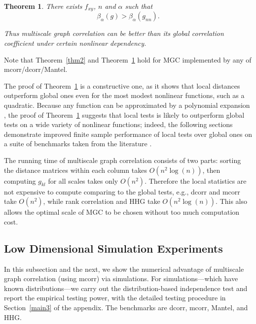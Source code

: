 \documentclass[11pt]{article}
\newcommand{\cs}[1]{{\color{blue}{#1}}}
\newtheorem{thm}{Theorem}
\begin{document}
\begin{thm}
\label{thm3}
There exists $f_{xy}$, $n$ and $\alpha$ such that 
\begin{equation}
\beta_{\alpha}(g) > \beta_{\alpha}(g_{nn}).
\end{equation}

Thus multiscale graph correlation can be better than its global correlation coefficient under certain nonlinear dependency.
\end{thm}
Note that Theorem~\ref{thm2} and Theorem~\ref{thm3} hold for MGC implemented by any of mcorr/dcorr/Mantel.

The proof of Theorem~\ref{thm3} is a constructive one, as it shows that local distances outperform global ones even for the most modest nonlinear functions, such as a quadratic.  Because any function can be approximated by a polynomial expansion \cite{RudinBook}, the proof of Theorem~\ref{thm3} suggests that local tests is likely to outperform global tests on a wide variety of nonlinear functions; indeed, the following sections demonstrate improved finite sample performance of local tests over global ones on a suite of benchmarks taken from the literature \cite{SzekelyRizzoBakirov2007, SimonTibshirani2012, GorfineHellerHeller2012, HellerGorfine2013}.

The running time of multiscale graph correlation consists of two parts: sorting the distance matrices within each column takes $O(n^2\log(n))$, then computing $g_{kl}$ for all scales takes only $O(n^2)$. Therefore the local statistics are not expensive to compute comparing to the global tests, e.g., dcorr and mcorr take $O(n^2)$, while rank correlation and HHG take $O(n^2\log(n))$. This also allows the optimal scale of MGC to be chosen without too much computation cost.

\cs{The running time is moved here; but I am not sure whether it worth a new subsection.}

\subsection{Low Dimensional Simulation Experiments}
\label{numer1}
In this subsection and the next, we show the numerical advantage of multiscale graph correlation (using mcorr) via simulations. For simulations---which have known distributions---we carry out the distribution-based independence test and report the empirical testing power, with the detailed testing procedure in Section~\ref{main3} of the appendix. The benchmarks are dcorr, mcorr, Mantel, and HHG.
\end{document}
